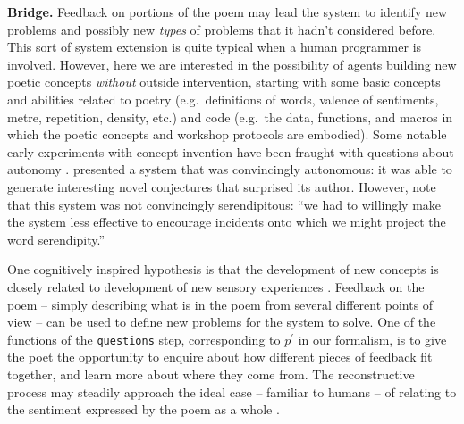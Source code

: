 \noindent \textbf{Bridge.}
Feedback on portions of the poem may lead the system to identify new
problems and possibly new \emph{types} of problems that it hadn't
considered before.  %
This sort of system extension is quite typical when a human programmer
is involved.  However, here we are interested in the possibility of
agents building new poetic concepts \emph{without} outside
intervention, starting with some basic concepts and abilities related
to poetry (e.g.~definitions of words, valence of sentiments, metre,
repetition, density, etc.) and code (e.g.~the data, functions, and
macros in which the poetic concepts and workshop protocols are
embodied).  Some notable early experiments with concept invention have
been fraught with questions about autonomy
\cite{ritchie1984case,lenat1984and}. 
presented a system that was convincingly autonomous: it was able to
generate interesting novel conjectures that surprised its author.
However,  note that this system was not
convincingly serendipitous: ``we had to willingly make the system less
effective to encourage incidents onto which we might project the word
serendipity.''

One cognitively inspired hypothesis is that 
the development of new concepts is closely related to development of new
sensory experiences \cite{milan2013kiki}.  
%
Feedback on the poem -- simply describing what
is in the poem from several different points of view -- can be used to
define new problems for the system to solve.
One of the functions of the {\tt questions} step, corresponding to $p^{\prime}$ in
our formalism, is to give the poet the opportunity to enquire about
how different pieces of feedback fit together, and learn more about
where they come from.  The reconstructive process may steadily approach the ideal case --
familiar to humans -- of relating to the sentiment expressed by the
poem as a whole \cite[p. 209]{bergson1983creative}.\par\medskip

